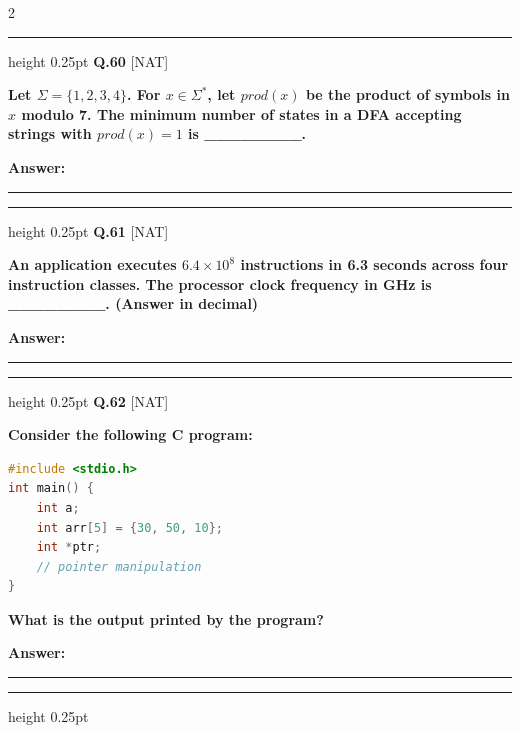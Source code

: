 \documentclass[a4paper,10pt,twoside]{article}
\begin{document}
\begin{multicols}{2}
\par\vspace{6pt}\hrule height 0.25pt\vspace{6pt}
\noindent\textbf{Q.60} \hfill {\footnotesize\textsf{[NAT]}}
\par\vspace{2pt}
{\bfseries Let $\Sigma = \{1, 2, 3, 4\}$. For $x \in \Sigma^*$, let $prod(x)$ be the product of symbols in $x$ modulo 7. The minimum number of states in a DFA accepting strings with $prod(x) = 1$ is \_\_\_\_\_\_\_\_. \par}
\par\vspace{3pt}\noindent\textbf{Answer:} \rule{3.2cm}{0.4pt}
\par\vspace{6pt}\hrule height 0.25pt\vspace{6pt}
\noindent\textbf{Q.61} \hfill {\footnotesize\textsf{[NAT]}}
\par\vspace{2pt}
{\bfseries An application executes $6.4 \times 10^8$ instructions in 6.3 seconds across four instruction classes. The processor clock frequency in GHz is \_\_\_\_\_\_\_\_. (Answer in decimal) \par}
\par\vspace{3pt}\noindent\textbf{Answer:} \rule{3.2cm}{0.4pt}
\par\vspace{6pt}\hrule height 0.25pt\vspace{6pt}
\noindent\textbf{Q.62} \hfill {\footnotesize\textsf{[NAT]}}
\par\vspace{2pt}
{\bfseries Consider the following C program:
 \par}\begin{lstlisting}[language=C, basicstyle=\scriptsize\ttfamily, frame=single, rulecolor=\color{black!40}, tabsize=2, breaklines=true, aboveskip=4pt, belowskip=4pt]
#include <stdio.h>
int main() {
    int a;
    int arr[5] = {30, 50, 10};
    int *ptr;
    // pointer manipulation
}
\end{lstlisting}{\bfseries 
What is the output printed by the program? \par}
\par\vspace{3pt}\noindent\textbf{Answer:} \rule{3.2cm}{0.4pt}
\par\vspace{6pt}\hrule height 0.25pt\vspace{6pt}

\end{multicols}
\end{document}
